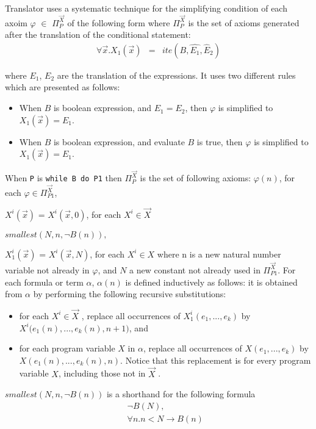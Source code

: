 Translator uses a systematic technique for the simplifying condition of each axoim $\varphi$ $\in$ $\Pi_P^{\vec{X}}$ of the following form where $\Pi_P^{\vec{X}}$ is the set of axioms generated after the translation of the conditional statement:
\begin{eqnarray}
\forall \vec{x}.X_1(\vec{x}) &=& ite(B,\hat{E_{1}},\hat{E}_{2})\label{rec2}
\end{eqnarray}

where $E_{1}$, $E_{2}$ are the translation of the expressions. It uses two different rules which are presented as follows:
\begin{itemize}
	\item When $B$ is boolean expression, and $E_{1}=E_{2}$, then $\varphi$ is simplified to $X_1(\vec{x})=E_{1}$.
	\item When $B$ is boolean expression, and evaluate $B$ is true, then $\varphi$ is simplified to $X_1(\vec{x})=E_{1}$.
\end{itemize}

\begin{defn}\label{Rule4} When \verb-P- is \verb-while B do P1- then $\Pi_P^{\vec{X}}$ is the set of following axioms:
	\vspace{2mm}
	$\varphi(n)$, for each $\varphi \in \Pi_{P1}^{\vec{X}}$,
	\vspace{2mm}
	
	$X^i(\vec{x})$ = $X^i(\vec{x}, 0)$, for each $X^i \in  \vec{X}$
	
	\vspace{2mm}
	$smallest(N, n, \neg B(n)),$
	
	\vspace{2mm}
	$X^i_1(\vec{x})$ = $X^i(\vec{x}, N)$, for each $X^i \in X$
	\vspace{2mm}
	where n is a new natural number variable not already in $\varphi$,
	and $N$ a new constant not already used in $\Pi_{P1}^{\vec{X}}$. 
	For each formula or term $\alpha$, $\alpha(n)$ is defined inductively as
	follows: it is obtained from $\alpha$ by performing the following
	recursive substitutions:
	\begin{itemize}
		\item for each $X^i 
		\in \vec{X}$ , replace all occurrences of 
		$X^{i}_1(e_1, ..., e_k)$ by $X^i(e_1(n), ..., e_k(n)$$, n + 1)$, and
		\item for each program variable $X$ in $\alpha$, replace all occurrences
		of $X(e_1, ..., e_k)$ by $X(e_1(n), ..., e_k(n), n)$. Notice
		that this replacement is for every program variable
		$X$, including those not in $\vec{X}$ .
	\end{itemize}
	$smallest(N, n, \neg B(n))$ is a shorthand for the following formula
	\begin{eqnarray}
	&& \neg  B(N), \label{smallest1}\\
	&&\forall n. n< N\rightarrow B(n) \label{smallest2}
	\end{eqnarray}
\end{defn}


